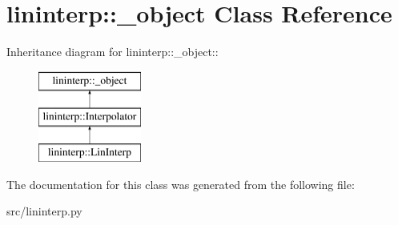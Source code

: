 \hypertarget{classlininterp_1_1__object}{
\section{lininterp::\_\-object Class Reference}
\label{d5/dd7/classlininterp_1_1__object}
}
Inheritance diagram for lininterp::\_\-object::\begin{figure}[H]
\begin{center}
\leavevmode
\includegraphics[height=3cm]{d5/dd7/classlininterp_1_1__object}
\end{center}
\end{figure}


The documentation for this class was generated from the following file:\begin{DoxyCompactItemize}
\item 
src/lininterp.py\end{DoxyCompactItemize}

